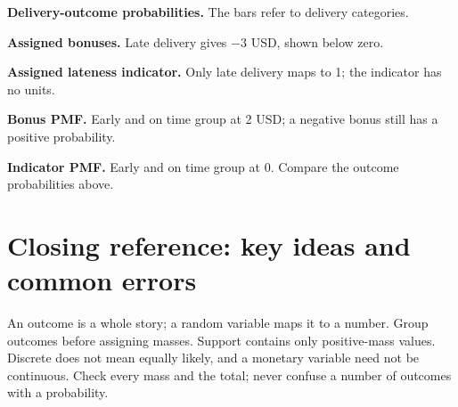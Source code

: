 \par\noindent \begin{minipage}[t]{.32\linewidth}
\centering
{}
\par\small \textbf{Delivery-outcome probabilities.} The bars refer to delivery categories.
\end{minipage}\hfill\begin{minipage}[t]{.32\linewidth}
\centering
{}
\par\small \textbf{Assigned bonuses.} Late delivery gives $-3$ USD, shown below zero.
\end{minipage}\hfill\begin{minipage}[t]{.32\linewidth}
\centering
{}
\par\small \textbf{Assigned lateness indicator.} Only late delivery maps to 1; the indicator has no units.
\end{minipage}\par\medskip
\par\noindent \begin{minipage}[t]{.485\linewidth}
\centering
{}
\par\small \textbf{Bonus PMF.} Early and on time group at 2 USD; a negative bonus still has a positive probability.
\end{minipage}\hfill\begin{minipage}[t]{.485\linewidth}
\centering
{}
\par\small \textbf{Indicator PMF.} Early and on time group at 0. Compare the outcome probabilities above.
\end{minipage}\par\medskip


\section{Closing reference: key ideas and common errors}
An outcome is a whole story; a random variable maps it to a number. Group outcomes before assigning masses. Support contains only positive-mass values. Discrete does not mean equally likely, and a monetary variable need not be continuous. Check every mass and the total; never confuse a number of outcomes with a probability.
\secInicio


